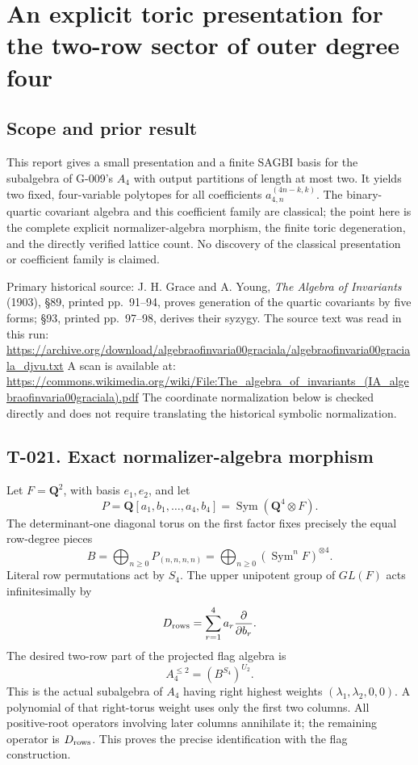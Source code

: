 \documentclass[
  10pt,
]{article}
\begin{document}
\section{An explicit toric presentation for the two-row sector of outer
degree
four}\label{an-explicit-toric-presentation-for-the-two-row-sector-of-outer-degree-four}

\subsection{Scope and prior result}\label{scope-and-prior-result}

This report gives a small presentation and a finite SAGBI basis for the
subalgebra of G-009's \(A_4\) with output partitions of length at most
two. It yields two fixed, four-variable polytopes for all coefficients
\(a_{4,n}^{(4n-k,k)}\). The binary-quartic covariant algebra and this
coefficient family are classical; the point here is the complete
explicit normalizer-algebra morphism, the finite toric degeneration, and
the directly verified lattice count. No discovery of the classical
presentation or coefficient family is claimed.

Primary historical source: J. H. Grace and A. Young, \emph{The Algebra
of Invariants} (1903), §89, printed pp.~91--94, proves generation of the
quartic covariants by five forms; §93, printed pp.~97--98, derives their
syzygy. The source text was read in this run:
\url{https://archive.org/download/algebraofinvaria00graciala/algebraofinvaria00graciala_djvu.txt}
A scan is available at:
\url{https://commons.wikimedia.org/wiki/File:The_algebra_of_invariants_(IA_algebraofinvaria00graciala).pdf}
The coordinate normalization below is checked directly and does not
require translating the historical symbolic normalization.

\subsection{T-021. Exact normalizer-algebra
morphism}\label{t-021.-exact-normalizer-algebra-morphism}

Let \(F=\mathbf Q^2\), with basis \(e_1,e_2\), and let \[
P=\mathbf Q[a_1,b_1,\ldots,a_4,b_4]
=\operatorname{Sym}(\mathbf Q^4\otimes F).
\] The determinant-one diagonal torus on the first factor fixes
precisely the equal row-degree pieces \[
B=\bigoplus_{n\ge0}P_{(n,n,n,n)}
=\bigoplus_{n\ge0}(\operatorname{Sym}^nF)^{\otimes4}.
\] Literal row permutations act by \(S_4\). The upper unipotent group of
\(GL(F)\) acts infinitesimally by \[
D_{\rm rows}=\sum_{r=1}^4 a_r\frac{\partial}{\partial b_r}.
\] The desired two-row part of the projected flag algebra is \[
A_4^{\le2}=(B^{S_4})^{U_2}.
\tag{Q4.1}
\] This is the actual subalgebra of \(A_4\) having right highest weights
\((\lambda_1,\lambda_2,0,0)\). A polynomial of that right-torus weight
uses only the first two columns. All positive-root operators involving
later columns annihilate it; the remaining operator is \(D_{\rm rows}\).
This proves the precise identification with the flag construction.
\end{document}
